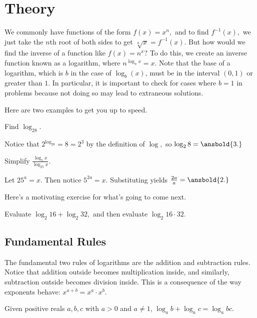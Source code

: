 \section{Theory}
We commonly have functions of the form $f(x)=x^n,$ and to find $f^{-1}(x),$ we just take the $n$th root of both sides to get $\sqrt[n]{x}=f^{-1}(x).$ But how would we find the inverse of a function like $f(x)=n^x?$ To do this, we create an inverse function known as a logarithm, where $n^{\log_nx}=x.$ Note that the base of a logarithm, which is $b$ in the case of $\log_b(x)$, must be in the interval $(0, 1)$ or greater than $1$.  In particular, it is important to check for cases where $b = 1$ in problems because not doing so may lead to extraneous solutions.

Here are two examples to get you up to speed.

\begin{exam}
Find $\log_28.$
\end{exam}

\begin{sol}
Notice that $2^{\log_28}=8=2^3$ by the definition of $\log,$ so $\log_28=\ansbold{3.}$
\end{sol}

\begin{exam}
Simplify $\frac{\log_5x}{\log_{25}x}.$
\end{exam}

\begin{sol}
Let $25^a=x.$ Then notice $5^{2a}=x.$ Substituting yields $\frac{2a}{a}=\ansbold{2.}$
\end{sol}

Here's a motivating exercise for what's going to come next.

\begin{exer}
Evaluate $\log_2{16}+\log_2{32},$ and then evaluate $\log_2{16\cdot 32}.$
\end{exer}

\subsection{Fundamental Rules}
The fundamental two rules of logarithms are the addition and subtraction rules. Notice that addition outside becomes multiplication inside, and similarly, subtraction outside becomes division inside. This is a consequence of the way exponents behave: $x^{a+b}=x^a\cdot x^b.$

\begin{theo}
Given positive reals $a,b,c$ with $a > 0$ and $a \neq 1$, $\log_{a}b+\log_{a}c=\log_{a}{bc}.$
\end{theo}

